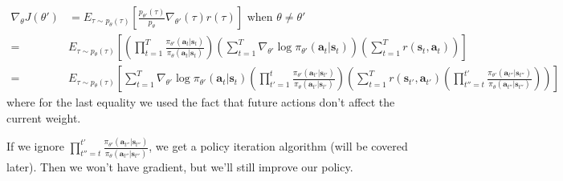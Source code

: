 \documentclass{report}
\begin{document}
\begin{align}
		\nabla_{\theta} J(\theta') &= E_{\tau \sim p_\theta(\tau)} \left[ \frac{p_{\theta'}(\tau)}{p_\theta} 
				\nabla_{\theta'} (\tau)
		r(\tau)  \right] \text{  when } \theta \neq \theta' \\
	=& E_{\tau \sim p_\theta(\tau)}
	\left[ 
			\left( \prod_{t=1}^{T} \frac{\pi_{\theta'} (\bm{a}_t | \bm{s}_t)}{\pi_\theta(\bm{a}_t | \bm{s}_t)}   \right) 
			\left( \sum_{t=1}^{T} \nabla_{\theta'} \log \pi_{\theta'}(\bm{a}_t | \bm{s}_t) \right) 
			\left( \sum_{t=1}^{T} r(\bm{s}_t, \bm{a}_t) \right) 
	\right] \\
	=& E_{\tau \sim p_\theta(\tau)}
	\left[ 
			\sum_{t=1}^{T} \nabla_{\theta'} \log \pi_{\theta'}(\bm{a}_t | \bm{s}_t)
			\left( \prod_{t'=1}^{t} \frac{\pi_{\theta'} (\bm{a}_{t'} | \bm{s}_{t'})}{\pi_\theta(\bm{a}_{t'} | \bm{s}_{t'})}   \right) 
			\left( \sum_{t=1}^{T} r(\bm{s}_{t'}, \bm{a}_{t'}) 
					\left( \prod_{t''=t}^{t'} \frac{\pi_{\theta'}(\bm{a}_{t''}|\bm{s}_{t''})}{\pi_{\theta}(\bm{a}_{t''}|\bm{s}_{t''})}  \right) 
			\right) 
	\right] 
\end{align}
where for the last equality we used the fact that future actions don't affect the current weight.

If we ignore $\prod_{t''=t}^{t'} \frac{\pi_{\theta'}(\bm{a}_{t''}|\bm{s}_{t''})}{\pi_{\theta}(\bm{a}_{t''}|\bm{s}_{t''})} $,
we get a policy iteration algorithm (will be covered later).
Then we won't have gradient, but we'll still improve our policy.
\end{document}
